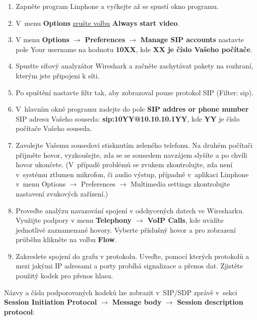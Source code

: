 \begin{enumerate}
    \item Zapněte program Linphone a vyčkejte až se spustí okno programu.
    \item V menu {\bf Options} \underline{zrušte volbu} {\bf Always start video}.
    \item V menu {\bf Options} $\rightarrow$ {\bf Preferences} $\rightarrow$ {\bf Manage SIP accounts} nastavte pole Your username na hodnotu {\bf 10XX}, kde {\bf XX je číslo Vašeho počítače}.
    \item Spusťte síťový analyzátor Wireshark a začněte zachytávat pakety na rozhraní, kterým jste připojeni k síti.
    \item Po spuštění nastavte filtr tak, aby zobrazoval pouze protokol SIP (Filter: sip).
    \item V hlavním okně programu zadejte do pole {\bf SIP addres or phone number} SIP adresu Vašeho souseda: {\bf sip:10YY@10.10.10.1YY}, kde {\bf YY} je číslo počítače Vašeho souseda.
    \item Zavolejte Vašemu sousedovi stisknutím zeleného telefonu. Na druhém počítači přijměte hovor, vyzkoušejte, zda se se sousedem navzájem slyšíte a po chvíli hovor ukončete.
(V případě problémů se zvukem zkontrolujte, zda není v systému ztlumen mikrofon, či audio výstup, případně v aplikaci Linphone v menu Options $\rightarrow$ Preferences $\rightarrow$ Multimedia settings zkontrolujte nastavení zvukových zařízení.) 
    \item Proveďte analýzu navazování spojení v odchycených datech ve Wiresharku. Využijte podpory v menu {\bf Telephony $\rightarrow$ VoIP Calls}, kde uvidíte jednotlivé zaznamenané hovory. Vyberte příslušný hovor a pro zobrazení průběhu klikněte na volbu {\bf Flow}.
    \item Zakreslete spojení do grafu v protokolu. Uveďte, pomocí kterých protokolů a mezi jakými IP adresami a porty probíhá signalizace a přenos dat. Zjistěte použitý kodek pro přenos hlasu.
\end{enumerate}
Názvy a čísla podporovaných kodeků lze zobrazit v SIP/SDP zprávě v sekci {\bf Session Initiation Protocol} $\rightarrow$ {\bf Message body} $\rightarrow$ {\bf Session description protocol}:
\begin{figure}[h!]
  \centering
\end{figure}

